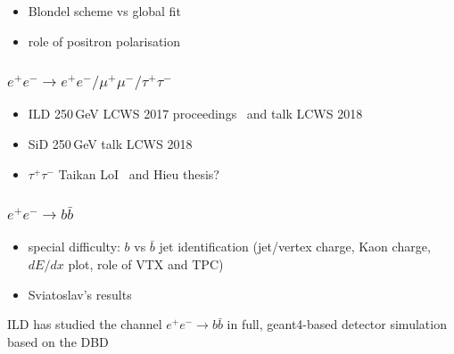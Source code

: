 \begin{itemize}
\item Blondel scheme vs global fit
\item role of positron polarisation
\end{itemize}

\subsubsection{$e^+e^- \to e^+ e^- / \mu^+ \mu^- / \tau^+\tau^-$}
\begin{itemize}
\item ILD 250\,GeV LCWS 2017 proceedings~\cite{Yamashiro:2018ant} and talk LCWS 2018
\item SiD 250\,GeV talk LCWS 2018
\item $\tau^+\tau^-$  Taikan LoI~\cite{Suehara:2009nj} and Hieu thesis?
\end{itemize}

\subsubsection{$e^+e^- \to b\bar{b}$}
\begin{itemize}
\item special difficulty: $b$ vs $\bar{b}$ jet identification (jet/vertex charge, Kaon charge, $dE/dx$ plot, role of VTX and TPC)
\item Sviatoslav's results
\end{itemize}

ILD has studied the channel $e^+e^- \to b\bar{b}$ in full, geant4-based detector simulation based on the DBD

